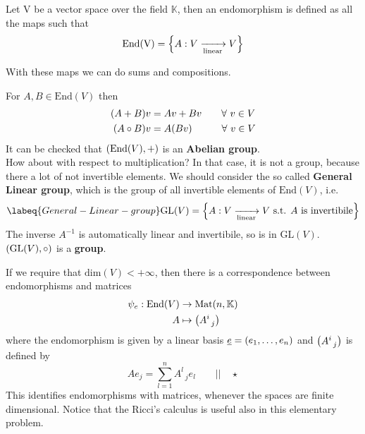 \documentclass[../main.tex]{subfiles}
\begin{document}
\begin{definition}
Let $\textrm{V}$ be a vector space over the field $\mathbb{K}$, then an endomorphism is defined as all the maps such that
\[
\textrm{End}(\textrm{V})=\Bqty{A:V\xrightarrow[\textrm{linear}]{}V}
\]
\end{definition}
With these maps we can do sums and compositions.
\begin{example}
For $A,B\in \textrm{End}(V)$ then
\[
\begin{split}
\pqty{A+B}v&=Av+Bv \quad  \quad \forall \ v\in V\\
\pqty{A\circ B}v&=A\pqty{Bv}\quad  \qquad \forall \ v\in V
\end{split}
\]
It can be checked that $\pqty{\textrm{End}(V),+}$ is an \textbf{Abelian group}.\\
How about with respect to multiplication? In that case, it is not a group, because there a lot of not invertible elements. We should consider the so called \textbf{General Linear group}, which is the group of all invertible elements of $\textrm{End}(V)$, i.e.
\begin{equation}\labeq{General-Linear-group}
\textrm{GL}(V)=\Bqty{A: V\xrightarrow[\textrm{linear}]{}V \ \textrm{s.t. $A$ is invertibile}}
\end{equation}
The inverse $A^{-1}$ is automatically linear and invertibile, so is in $\textrm{GL}(V)$. $\pqty{\textrm{GL}(V),\circ}$ is a \textbf{group}.
\end{example}
If we require that $\textrm{dim}(V)<+\infty$, then there is a correspondence between endomorphisms and matrices
\[
\begin{split}
\psi_e : \textrm{End}(V)& \to  \textrm{Mat}(n,\mathbb{K})\\
A &\mapsto \pqty{A^i_{\;\;j}}
\end{split}
\]
where the endomorphism is given by a linear basis $\underline{e}=\pqty{e_1,\dots,e_n}$ and $ \pqty{A^i_{\;\;j}}$ is defined by
\[
Ae_j=\sum_{l=1}^n A^l_{\;\;j}e_l \qquad \Big|\Big| \quad \star
\]
This identifies endomorphisms with matrices, whenever the spaces are finite dimensional. Notice that the Ricci's calculus is useful also in this elementary problem.
\end{document}
